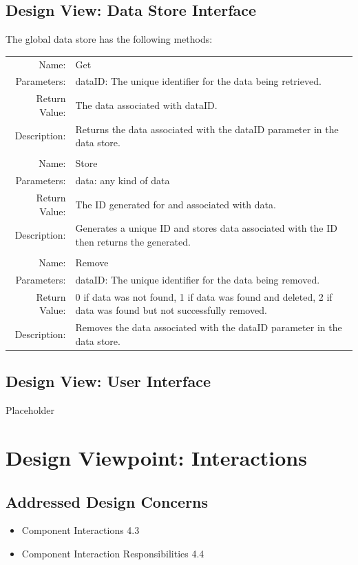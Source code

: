 \documentclass[onecolumn, draftclsnofoot,10pt, compsoc]{IEEEtran}
\newcommand{\designConcernRef}[2][]{
    #2 #1
}
\begin{document}
    \subsection{Design View: Data Store Interface}
        The global data store has the following methods: \\
        \begin{tabular}[t]{r p{6in}}
            Name: & Get \\
            Parameters: & dataID: The unique identifier for the data being retrieved.\\
            Return Value: & The data associated with dataID.\\
            Description: & Returns the data associated with the dataID parameter in the data store. \\
            & \\
            Name: & Store \\
            Parameters: & data: any kind of data \\
            Return Value: & The ID generated for and associated with data.\\
            Description: & Generates a unique ID and stores data associated with the ID then returns the generated. \\
            & \\
            Name: & Remove \\
            Parameters: & dataID: The unique identifier for the data being removed.\\
            Return Value: & 0 if data was not found, 1 if data was found and deleted, 2 if data was found but not successfully removed. \\
            Description: & Removes the data associated with the dataID parameter in the data store. \\
        \end{tabular}

    \subsection{Design View: User Interface}
        Placeholder

\section{Design Viewpoint: Interactions}
    \subsection{Addressed Design Concerns}
        \begin{itemize}
            \item \designConcernRef[4.3]{Component Interactions}
            \item \designConcernRef[4.4]{Component Interaction Responsibilities}
        \end{itemize}
\end{document}
